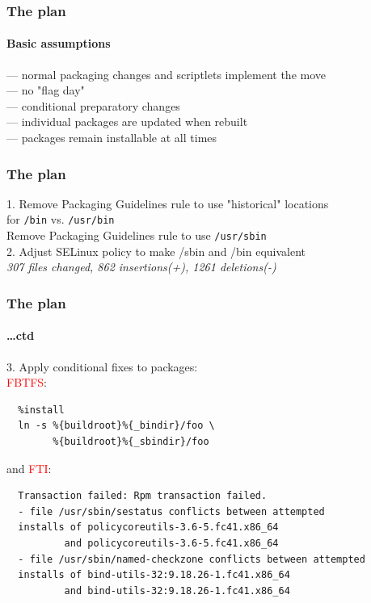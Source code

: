 \documentclass[]{beamer}
\newcommand\pp{}
\begin{document}
\begin{frame}
  \frametitle{The plan}
  \framesubtitle{Basic assumptions}

  \pp
  — normal packaging changes and scriptlets implement the move
  \\\pp

  — no "flag day"
  \\\pp
  \phantom{—} — conditional preparatory changes%
  \\\pp
  \phantom{—} — individual packages are updated when rebuilt
  \\\pp
  \phantom{—} — packages remain installable at all times
\end{frame}

\begin{frame}[fragile]
  \frametitle{The plan}

  \pp
  1. Remove Packaging Guidelines rule to use "historical" locations\\
     \hspace*{5em} for \texttt{/bin} vs. \texttt{/usr/bin}\\
     Remove Packaging Guidelines rule to use \texttt{/usr/sbin}
  \\

  \pp
  2. Adjust SELinux policy to make /sbin and /bin equivalent\\
  \textit{307 files changed, 862 insertions(+), 1261 deletions(-)}

  \hfill
\end{frame}

\begin{frame}[fragile]
  \frametitle{The plan}
  \framesubtitle{…ctd}

  3. Apply conditional fixes to packages:\\
  \textcolor{red}{FBTFS}:{\small
  \begin{verbatim}
  %install
  ln -s %{buildroot}%{_bindir}/foo \
        %{buildroot}%{_sbindir}/foo
  \end{verbatim}
  }
  and \textcolor{red}{FTI}:{\small
  \begin{verbatim}
  Transaction failed: Rpm transaction failed.
  - file /usr/sbin/sestatus conflicts between attempted
  installs of policycoreutils-3.6-5.fc41.x86_64
          and policycoreutils-3.6-5.fc41.x86_64
  - file /usr/sbin/named-checkzone conflicts between attempted
  installs of bind-utils-32:9.18.26-1.fc41.x86_64
          and bind-utils-32:9.18.26-1.fc41.x86_64
  \end{verbatim}
  }

  \hfill
\end{frame}
\end{document}
